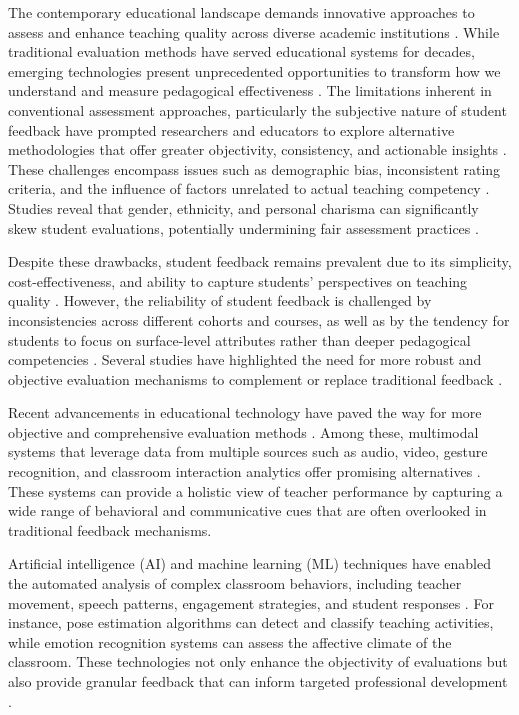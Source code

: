 
The contemporary educational landscape demands innovative approaches to assess and enhance teaching quality across diverse academic institutions \cite{Heffernan2022}. While traditional evaluation methods have served educational systems for decades, emerging technologies present unprecedented opportunities to transform how we understand and measure pedagogical effectiveness \cite{Ajmal2024}. The limitations inherent in conventional assessment approaches, particularly the subjective nature of student feedback have prompted researchers and educators to explore alternative methodologies that offer greater objectivity, consistency, and actionable insights \cite{Heffernan2022}. These challenges encompass issues such as demographic bias, inconsistent rating criteria, and the influence of factors unrelated to actual teaching competency \cite{Steinberg2021}. Studies reveal that gender, ethnicity, and personal charisma can significantly skew student evaluations, potentially undermining fair assessment practices \cite{Steinberg2021}.

Despite these drawbacks, student feedback remains prevalent due to its simplicity, cost-effectiveness, and ability to capture students' perspectives on teaching quality \cite{Ajmal2024}. However, the reliability of student feedback is challenged by inconsistencies across different cohorts and courses, as well as by the tendency for students to focus on surface-level attributes rather than deeper pedagogical competencies \cite{carvalho2022biases}. Several studies have highlighted the need for more robust and objective evaluation mechanisms to complement or replace traditional feedback \cite{Ginsburg2022NecessaryBI}.

Recent advancements in educational technology have paved the way for more objective and comprehensive evaluation methods \cite{Wang2022}. Among these, multimodal systems that leverage data from multiple sources such as audio, video, gesture recognition, and classroom interaction analytics offer promising alternatives \cite{10.1007/978-981-99-9109-9_7}. These systems can provide a holistic view of teacher performance by capturing a wide range of behavioral and communicative cues that are often overlooked in traditional feedback mechanisms.

Artificial intelligence (AI) and machine learning (ML) techniques have enabled the automated analysis of complex classroom behaviors, including teacher movement, speech patterns, engagement strategies, and student responses \cite{Wang2022}. For instance, pose estimation algorithms can detect and classify teaching activities, while emotion recognition systems can assess the affective climate of the classroom. These technologies not only enhance the objectivity of evaluations but also provide granular feedback that can inform targeted professional development \cite{YE2023108915}.

